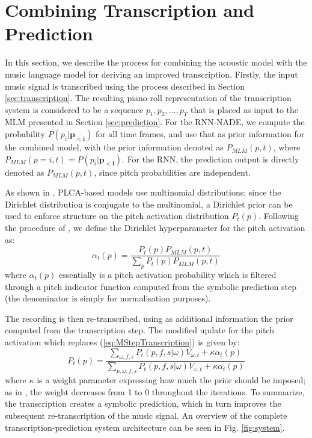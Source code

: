 \section{Combining Transcription and Prediction}
\label{sec:combination}


In this section, we describe the process for combining the acoustic model with the music language model for deriving an improved transcription. Firstly, the input music signal is transcribed using the process described in Section \ref{sec:transcription}. The resulting piano-roll representation of the transcription system is considered to be a sequence $p_1, p_2, \ldots, p_T$ that is placed as input to the MLM presented in Section \ref{sec:prediction}. For the RNN-NADE, we compute the probability $P(p_i|\mathbf{p_{<i}})$ for all time frames, and use that as prior information for the combined model, with the prior information  denoted as $P_{\mathit{MLM}}(p,t)$, where $P_{\mathit{MLM}}(p=i,t)=P(p_i|\mathbf{p_{<i}})$. For the RNN, the prediction output is directly denoted as $P_{\mathit{MLM}}(p,t)$, since pitch probabilities are independent.

As shown in \cite{Smaragdis2009}, PLCA-based models use multinomial distributions; since the Dirichlet distribution is conjugate to the multinomial, a Dirichlet prior can be used to enforce structure on the pitch activation distribution $P_{t}(p)$. Following the procedure of \cite{Smaragdis2009}, we define the Dirichlet hyperparameter for the pitch activation as:
\begin{equation}
 \alpha_{t}(p) = \frac{P_{t}(p)P_{\mathit{MLM}}(p,t)}{\sum_{p}P_{t}(p)P_{\mathit{MLM}}(p,t)}
\end{equation}
where $\alpha_{t}(p)$ essentially is a pitch activation probability which is filtered through a pitch indicator function computed from the symbolic prediction step (the denominator is simply for normalisation purposes).

The recording is then re-transcribed, using as additional information the prior computed from the transcription step. The modified update for the pitch activation which replaces (\ref{eq:MStepTranscription}) is given by:
\begin{equation}
 P_{t}(p) = \frac{\sum_{\omega,f,s}P_{t}(p,f,s|\omega)V_{\omega,t}+\kappa\alpha_{t}(p)}{\sum_{p,\omega,f,s}P_{t}(p,f,s|\omega)V_{\omega,t}+\kappa\alpha_{t}(p)} \label{eq:modifiedMStepPitchActivation}
\end{equation}
where $\kappa$ is a weight parameter expressing how much the prior should be imposed; as in \cite{Smaragdis2009}, the weight decreases from 1 to 0 throughout the iterations. To summarize, the transcription creates a symbolic prediction, which in turn improves the subsequent re-transcription of the music signal. An overview of the complete transcription-prediction system architecture can be seen in Fig. \ref{fig:system}.

